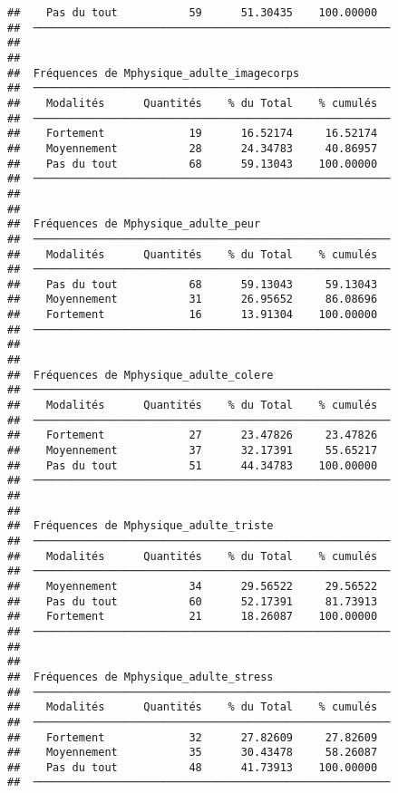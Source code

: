 \documentclass[
]{article}
\begin{document}
\begin{verbatim}
##    Pas du tout           59      51.30435    100.00000   
##  ─────────────────────────────────────────────────────── 
## 
## 
##  Fréquences de Mphysique_adulte_imagecorps               
##  ─────────────────────────────────────────────────────── 
##    Modalités      Quantités    % du Total    % cumulés   
##  ─────────────────────────────────────────────────────── 
##    Fortement             19      16.52174     16.52174   
##    Moyennement           28      24.34783     40.86957   
##    Pas du tout           68      59.13043    100.00000   
##  ─────────────────────────────────────────────────────── 
## 
## 
##  Fréquences de Mphysique_adulte_peur                     
##  ─────────────────────────────────────────────────────── 
##    Modalités      Quantités    % du Total    % cumulés   
##  ─────────────────────────────────────────────────────── 
##    Pas du tout           68      59.13043     59.13043   
##    Moyennement           31      26.95652     86.08696   
##    Fortement             16      13.91304    100.00000   
##  ─────────────────────────────────────────────────────── 
## 
## 
##  Fréquences de Mphysique_adulte_colere                   
##  ─────────────────────────────────────────────────────── 
##    Modalités      Quantités    % du Total    % cumulés   
##  ─────────────────────────────────────────────────────── 
##    Fortement             27      23.47826     23.47826   
##    Moyennement           37      32.17391     55.65217   
##    Pas du tout           51      44.34783    100.00000   
##  ─────────────────────────────────────────────────────── 
## 
## 
##  Fréquences de Mphysique_adulte_triste                   
##  ─────────────────────────────────────────────────────── 
##    Modalités      Quantités    % du Total    % cumulés   
##  ─────────────────────────────────────────────────────── 
##    Moyennement           34      29.56522     29.56522   
##    Pas du tout           60      52.17391     81.73913   
##    Fortement             21      18.26087    100.00000   
##  ─────────────────────────────────────────────────────── 
## 
## 
##  Fréquences de Mphysique_adulte_stress                   
##  ─────────────────────────────────────────────────────── 
##    Modalités      Quantités    % du Total    % cumulés   
##  ─────────────────────────────────────────────────────── 
##    Fortement             32      27.82609     27.82609   
##    Moyennement           35      30.43478     58.26087   
##    Pas du tout           48      41.73913    100.00000   
##  ─────────────────────────────────────────────────────── 

\end{verbatim}
\end{document}
